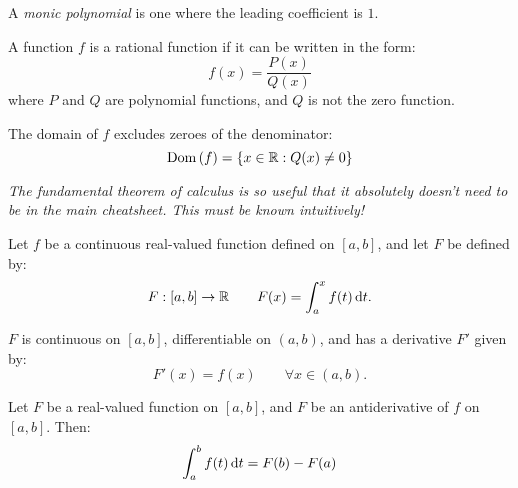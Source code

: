 \begin{multicols}{2}
\begin{CheatsheetEntryFrame}
        A \textit{monic polynomial} is one where the leading coefficient is $1$.

        \CheatsheetEntryExtraSeparation


        A function $f$ is a rational function if it can be written in the form:
        \begin{equation*}
            f(x) = \frac{P(x)}{Q(x)}
        \end{equation*}
        where $P$ and $Q$ are polynomial functions, and $Q$ is not the zero function.

        The domain of $f$ excludes zeroes of the denominator:
        \begin{equation*}
            \dom{(f)} = \braces*{x \in \mathbb{R} : Q(x) \ne 0}
        \end{equation*}

    \end{CheatsheetEntryFrame}

    \MulticolsBreak

    \begin{CheatsheetEntryFrame}

        \textit{The fundamental theorem of calculus is so useful that it absolutely doesn't need to be in the main cheatsheet. This must be known intuitively!}

        \CheatsheetEntryExtraSeparation

        
        Let $f$ be a continuous real-valued function defined on $[a, b]$, and let $F$ be defined by:
        \begin{equation*}
            F : [a, b] \to \mathbb{R}
                \qquad F(x) = \int_a^x{f(t) \,\diff{t}} .
        \end{equation*}

        $F$ is continuous on $[a, b]$, differentiable on $(a, b)$, and has a derivative $F'$ given by:
        \begin{equation*}
            F'(x) = f(x)
                \qquad \forall x \in (a, b) .
        \end{equation*}


        Let $F$ be a real-valued function on $[a, b]$, and $F$ be an antiderivative of $f$ on $[a, b]$. Then:
        \begin{equation*}
            \int_a^b{f(t) \,\diff{t}} = F(b) - F(a)
        \end{equation*}


    \end{CheatsheetEntryFrame}

\end{multicols}

